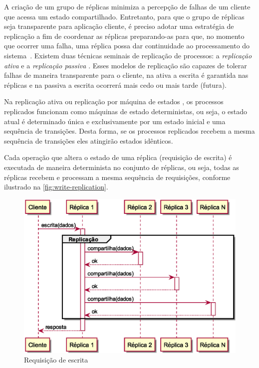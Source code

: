 A criação de um grupo de réplicas minimiza a percepção de falhas de um cliente que acessa
um estado compartilhado. Entretanto, para que o grupo de réplicas seja transparente para
aplicação cliente, é preciso adotar uma estratégia de replicação a fim de coordenar as
réplicas preparando-as para que, no momento que ocorrer uma falha, uma réplica possa dar
continuidade ao processamento do sistema~\cite{jalote94}. Existem duas técnicas seminais
de replicação de processos: a \emph{replicação ativa} e a \emph{replicação passiva}
\cite{jalote94}. Esses modelos de replicação são capazes de tolerar falhas de maneira
transparente para o cliente, na ativa a escrita é garantida nas réplicas e na passiva a
escrita ocorrerá mais cedo ou mais tarde (futura).

Na replicação ativa \cite{coulouris11, guerraoui97} ou replicação por máquina de estados
\cite{schneider90}, os processos replicados funcionam como máquinas de estado
deterministas, ou seja, o estado atual é determinado única e exclusivamente por um estado
inicial e uma sequência de transições. Desta forma, se os processos replicados recebem a
mesma sequência de transições eles atingirão estados idênticos.

Cada operação que altera o estado de uma réplica (requisição de escrita) é executada de
maneira determinista no conjunto de réplicas, ou seja, todas as réplicas recebem e
processam a mesma sequência de requisições, conforme ilustrado na
\autoref{fig:write-replication}.

\begin{figure}[htbp]
  \centering
  \includegraphics[width=14.5cm]{conteudo/capitulos/figuras/escrita.eps}
  \caption{Requisição de escrita}
  \label{fig:write-replication}
\end{figure}

